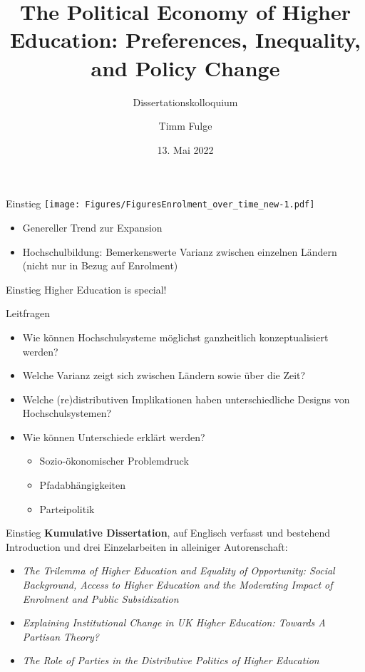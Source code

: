 \documentclass[
  ignorenonframetext,
]{beamer}
\title{The Political Economy of Higher Education: Preferences,
Inequality, and Policy Change}
\subtitle{Dissertationskolloquium}
\author{Timm Fulge}
\date{13. Mai 2022}
\begin{document}
\frame{\titlepage}

\begin{frame}{Einstieg}
\protect\hypertarget{einstieg}{}
\texttt{[image: Figures/FiguresEnrolment\_over\_time\_new-1.pdf]} \pause

\begin{itemize}
\item{Genereller Trend zur Expansion}
\item{Hochschulbildung: Bemerkenswerte Varianz zwischen einzelnen Ländern (nicht nur in Bezug auf Enrolment)}
\end{itemize}
\end{frame}

\begin{frame}{Einstieg}
\protect\hypertarget{einstieg-1}{}
Higher Education is special!

\pause

\begin{alertblock}{Leitfragen}
\begin{itemize}[<+->]
\item{Wie können Hochschulsysteme möglichst ganzheitlich konzeptualisiert werden?}
\item{Welche Varianz zeigt sich zwischen Ländern sowie über die Zeit?}
\item{Welche (re)distributiven Implikationen haben unterschiedliche Designs von Hochschulsystemen?}
\item{Wie können Unterschiede erklärt werden?}
\begin{itemize}
\item{Sozio-ökonomischer Problemdruck}
\item{Pfadabhängigkeiten}
\item{Parteipolitik}
\end{itemize}
\end{itemize}
\end{alertblock}
\end{frame}

\begin{frame}{Einstieg}
\protect\hypertarget{einstieg-2}{}
\textbf{Kumulative Dissertation}, auf Englisch verfasst und bestehend
Introduction und drei Einzelarbeiten in alleiniger Autorenschaft:

\begin{itemize}
\item{\textit{The Trilemma of Higher Education and Equality of Opportunity: Social Background, Access to Higher Education and the Moderating Impact of Enrolment and Public Subsidization}}
\item{\textit{Explaining Institutional Change in UK Higher Education: Towards A Partisan Theory?}}
\item{\textit{The Role of Parties in the Distributive Politics of Higher Education}}
\end{itemize}
\end{frame}
\end{document}
